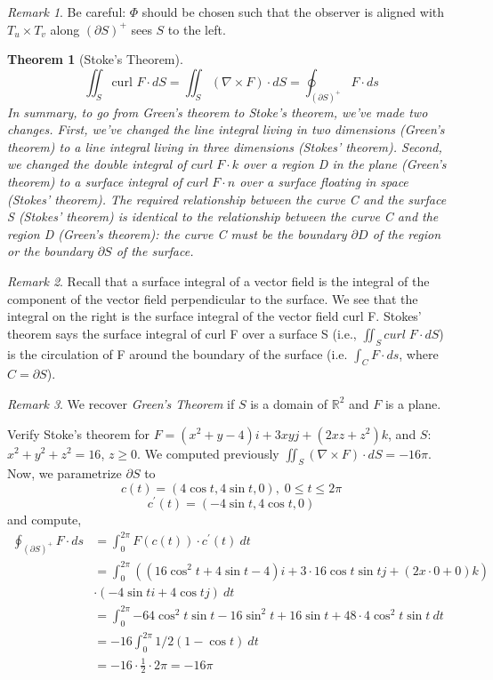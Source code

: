 \documentclass[12pt]{book}
\newtheorem{theorem}{Theorem}[section]
\theoremstyle{definition}
\theoremstyle{remark}
\newtheorem*{remark}{Remark}
\begin{document}
\begin{remark} 
  Be careful: $\Phi$ should be chosen such that the observer is aligned with $T_u \times T_v$ along $(\partial S)^+$ sees $S$ to the left. 
\end{remark}
\begin{theorem}[Stoke's Theorem] \label{Stoke}
  $$\iint_S \text{curl } F\cdot {} dS = \iint_S (\nabla \times F)\cdot {} dS = \oint_{(\partial S)^+}F \cdot {ds}$$
In summary, to go from Green's theorem to Stoke's theorem, we've made two changes. First, we've changed the line integral living in two dimensions (Green's theorem) to a line integral living in three dimensions (Stokes' theorem). Second, we changed the double integral of $curl\; F \cdot k$  over a region D in the plane (Green's theorem) to a surface integral of $curl \; F \cdot n$  over a surface floating in space (Stokes' theorem). The required relationship between the curve C and the surface S (Stokes' theorem) is identical to the relationship between the curve C and the region D (Green's theorem): the curve C must be the boundary $\partial D$ of the region or the boundary $\partial S$ of the surface.
\end{theorem}
\begin{remark} 
  Recall that a surface integral of a vector field is the integral of the component of the vector field perpendicular to the surface. We see that the integral on the right is the surface integral of the vector field curl F. Stokes' theorem says the surface integral of curl F over a surface S (i.e., $\iint_S curl \; F \cdot dS
  $) is the circulation of F around the boundary of the surface (i.e. $\int_C F \cdot ds$, where $C = \partial S$).
\end{remark}
\begin{remark} 
  We recover \textit{Green's Theorem} if $S$ is a domain of $\mathbb{R}^2$ and $F$ is a plane. 
\end{remark}
\begin{example}Verify Stoke's theorem for $F = (x^2 + y - 4)i + 3xy j + (2xz + z^2)k $, and $S:$ $x^2 + y^2 + z^2 = 16$, $z \geq 0.$ We computed previously $\iint_S ( \nabla \times F) \cdot dS = -16 \pi$. Now, we parametrize $\partial S$ to 
  $$c(t) = (4 \cos t , 4 \sin t , 0), \; 0\leq t \leq 2 \pi $$
  $$c ^\prime (t) = ( -4 \sin t , 4 \cos t, 0 ) $$
  and compute, 
  \begin{equation*}
    \begin{split}
      \oint_{(\partial S)^+}F \cdot {ds} &= \int_{{0}}^{{2\pi}} {F(c(t))\cdot c^\prime (t)} \: d{t} \\ 
      &= \int_{{0}}^{{2 \pi}} ((16 \cos^2 t + 4 \sin t -4)i + 3 \cdot {16} \cos t \sin t j + (2 x \cdot {0}+ 0)k) \\ &\cdot {(-4\sin t i + 4 \cos t j )} \: d{t} \\ 
      &= \int_{{0}}^{2\pi} {-64 \cos^2 t \sin t - 16 \sin ^2 t + 16 \sin t+ 48  \cdot 4 \cos ^2 t\sin t} \: d{t} \\ 
      &= -16 \int_{{0}}^{{2 \pi}} {1/2(1 - \cos t)} \: d{t}\\ 
      &=-16 \cdot \frac{1}{2} \cdot 2 \pi = -16 \pi 
    \end{split}
  \end{equation*}
\end{example}
\end{document}

